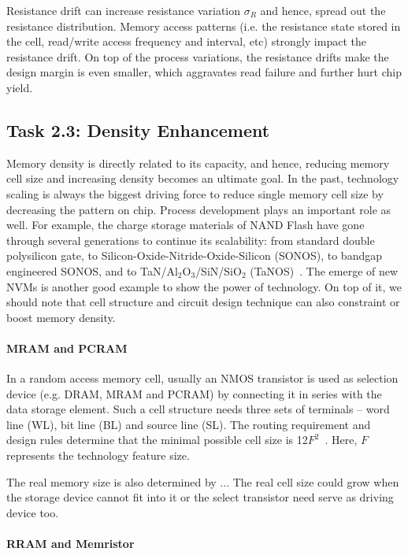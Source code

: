 Resistance drift can increase resistance variation $\sigma_R$ and hence, spread out the resistance distribution. Memory access patterns (i.e. the resistance state stored in the cell, read/write access frequency and interval, etc) strongly impact the resistance drift. On top of the process variations, the resistance drifts make the design margin is even smaller, which aggravates read failure and further hurt chip yield.


\subsection{Task 2.3: Density Enhancement}

Memory density is directly related to its capacity, and hence, reducing memory cell size and increasing density becomes an ultimate goal. In the past, technology scaling is always the biggest driving force to reduce single memory cell size by decreasing the pattern on chip. Process development plays an important role as well. For example, the charge storage materials of NAND Flash have gone through several generations to continue its scalability: from standard double polysilicon gate, to Silicon-Oxide-Nitride-Oxide-Silicon (SONOS), to bandgap engineered SONOS, and to TaN/Al$_2$O$_3$/SiN/SiO$_2$ (TaNOS)~\cite{Lu09}. The emerge of new NVMs is another good example to show the power of technology. On top of it, we should note that cell structure and circuit design technique can also constraint or boost memory density.

\paragraph{MRAM and PCRAM}

In a random access memory cell, usually an NMOS transistor is used as selection device (e.g. DRAM, MRAM and PCRAM) by connecting it in series with the data storage element. Such a cell structure needs three sets of terminals -- word line (WL), bit line (BL) and source line (SL). The routing requirement and design rules determine that the minimal possible cell size is 12$F^2$~\cite{Li09}. Here, $F$ represents the technology feature size.

The real memory size is also determined by ...
The real cell size could grow when the storage device cannot fit into it or the select transistor need serve as driving device too.



\paragraph{RRAM and Memristor}

